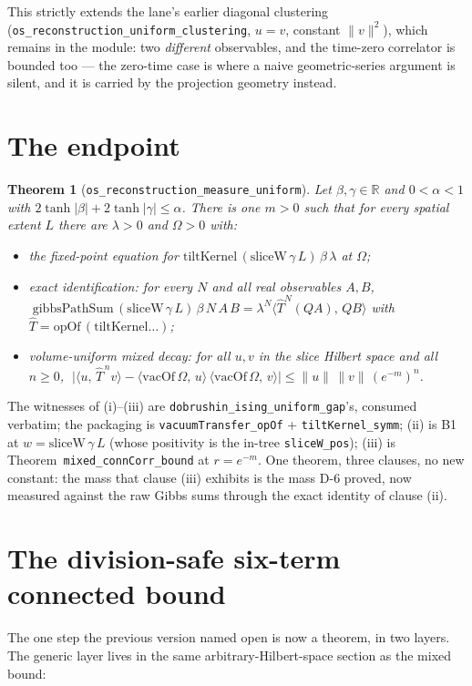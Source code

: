 \documentclass[11pt]{article}
\newtheorem{theorem}{Theorem}[section]
\newcommand{\lean}[1]{\texttt{#1}}
\newcommand{\ip}[2]{\langle #1,\,#2\rangle}
\begin{document}
This strictly extends the lane's earlier diagonal clustering
(\lean{os\_reconstruction\_uniform\_clustering}, $u = v$, constant
$\lVert v\rVert^2$), which remains in the module: two \emph{different}
observables, and the time-zero correlator is bounded too --- the
zero-time case is where a naive geometric-series argument is silent,
and it is carried by the projection geometry instead.

\section{The endpoint}\label{sec:endpoint}
\begin{theorem}[\lean{os\_reconstruction\_measure\_uniform}]
Let $\beta, \gamma \in \mathbb{R}$ and $0 < \alpha < 1$ with
$2\tanh|\beta|+2\tanh|\gamma| \le \alpha$.  There is \emph{one}
$m > 0$ such that for \emph{every} spatial extent $L$ there are
$\lambda > 0$ and $\Omega > 0$ with:
\begin{itemize}
\item[(i)] the fixed-point equation for
$\mathrm{tiltKernel}\,(\mathrm{sliceW}\,\gamma\,L)\,\beta\,\lambda$
at $\Omega$;
\item[(ii)] \emph{exact identification}: for every $N$ and all real
observables $A, B$,
$\;\mathrm{gibbsPathSum}\,(\mathrm{sliceW}\,\gamma\,L)\,\beta\,N\,A\,B
= \lambda^N \ip{\hat T^N (QA)}{QB}$ with
$\hat T = \mathrm{opOf}\,(\mathrm{tiltKernel}\ldots)$;
\item[(iii)] \emph{volume-uniform mixed decay}: for all
$u, v$ in the slice Hilbert space and all $n \ge 0$,
$\;\bigl|\ip{u}{\hat T^{\,n} v} -
\ip{\mathrm{vacOf}\,\Omega}{u}\,\ip{\mathrm{vacOf}\,\Omega}{v}\bigr|
\le \lVert u\rVert\,\lVert v\rVert\,(e^{-m})^n$.
\end{itemize}
\end{theorem}
The witnesses of (i)--(iii) are \lean{dobrushin\_ising\_uniform\_gap}'s,
consumed verbatim; the packaging is \lean{vacuumTransfer\_opOf} +
\lean{tiltKernel\_symm}; (ii) is B1 at $w = \mathrm{sliceW}\,\gamma\,L$
(whose positivity is the in-tree \lean{sliceW\_pos}); (iii) is
Theorem~\lean{mixed\_connCorr\_bound} at $r = e^{-m}$.  One theorem,
three clauses, no new constant: the mass that clause (iii) exhibits is
the mass D-6 proved, now measured against the raw Gibbs sums through
the exact identity of clause (ii).

\section{The division-safe six-term connected bound}
\label{sec:sixterm}
The one step the previous version named open is now a theorem, in two
layers.  The generic layer lives in the same arbitrary-Hilbert-space
section as the mixed bound:
\end{document}

